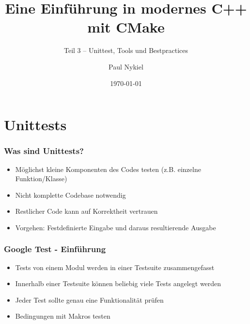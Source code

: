 \documentclass[aspectratio=169]{beamer}
\title{Eine Einführung in modernes C++ mit CMake}
\subtitle{Teil 3 -- Unittest, Tools und Bestpractices}
\author{Paul Nykiel}
\date{\today}
\begin{document}
\maketitle


\section{Unittests}
\begin{frame}
    \frametitle{Was sind Unittests?}
    \begin{itemize}
        \item Möglichst kleine Komponenten des Codes testen (z.B. einzelne Funktion/Klasse)
            \pause
        \item Nicht komplette Codebase notwendig
            \pause
        \item Restlicher Code kann auf Korrektheit vertrauen
            \pause
        \item Vorgehen: Festdefinierte Eingabe und daraus resultierende Ausgabe
    \end{itemize}
\end{frame}

\begin{frame}
    \frametitle{Google Test - Einführung}
    \begin{itemize}
        \item Tests von einem Modul werden in einer Testsuite zusammengefasst
            \pause
        \item Innerhalb einer Testsuite können beliebig viele Tests angelegt werden
            \pause
        \item Jeder Test sollte genau eine Funktionalität prüfen
            \pause
        \item Bedingungen mit Makros testen
    \end{itemize}
\end{frame}
\end{document}
